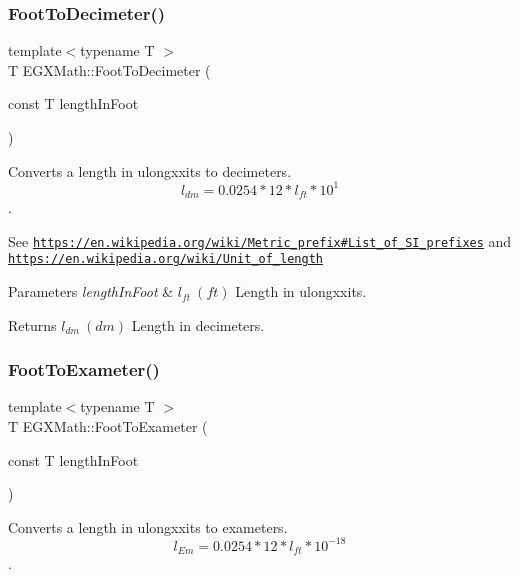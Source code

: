 \subsubsection{\texorpdfstring{Foot\+To\+Decimeter()}{FootToDecimeter()}}
{\footnotesize\ttfamily template$<$typename T $>$ \\
T E\+G\+X\+Math\+::\+Foot\+To\+Decimeter (\begin{DoxyParamCaption}\item[{const T}]{length\+In\+Foot }\end{DoxyParamCaption})}



Converts a length in ulongxxits to decimeters. \[ l_{dm}=0.0254 * 12 * l_{ft} * 10^{1} \]. 

See \href{https://en.wikipedia.org/wiki/Metric_prefix#List_of_SI_prefixes}{\tt https\+://en.\+wikipedia.\+org/wiki/\+Metric\+\_\+prefix\#\+List\+\_\+of\+\_\+\+S\+I\+\_\+prefixes} and \href{https://en.wikipedia.org/wiki/Unit_of_length}{\tt https\+://en.\+wikipedia.\+org/wiki/\+Unit\+\_\+of\+\_\+length} 
\begin{DoxyParams}{Parameters}
{\em length\+In\+Foot} & $ l_{ft}\ (ft)$ Length in ulongxxits. \\
\hline
\end{DoxyParams}
\begin{DoxyReturn}{Returns}
$ l_{dm}\ (dm)$ Length in decimeters. 
\end{DoxyReturn}
\mbox{\label{group___e_g_x_math-_conversions-_length_conversions-_imperial-_foot-_s_i_gaf2d43637b7f1ee964274c36ceeff93b2}} 
\subsubsection{\texorpdfstring{Foot\+To\+Exameter()}{FootToExameter()}}
{\footnotesize\ttfamily template$<$typename T $>$ \\
T E\+G\+X\+Math\+::\+Foot\+To\+Exameter (\begin{DoxyParamCaption}\item[{const T}]{length\+In\+Foot }\end{DoxyParamCaption})}



Converts a length in ulongxxits to exameters. \[ l_{Em}=0.0254 * 12 * l_{ft} * 10^{-18} \]. 

